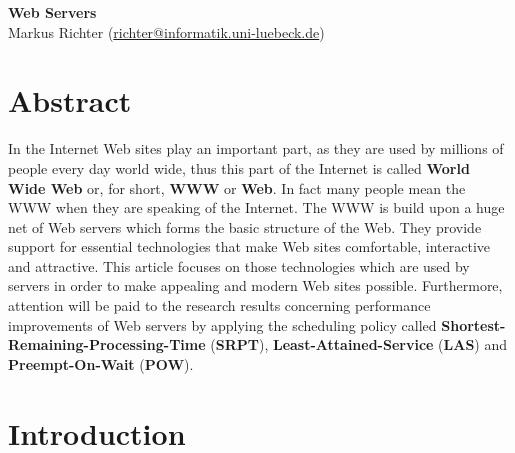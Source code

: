 \documentclass[
  a4paper,               %
  twoside,               %
  headings=small,        %
  DIV=12,                %
  BCOR=1cm,              %
  headinclude=true,      %
  footinclude=true,      %
  numbers=noenddot,      %
  11pt]{scrartcl}        %
\begin{document}
\begin{center}
\textbf{\huge Web Servers} \\[1em]
Markus Richter (\url{richter@informatik.uni-luebeck.de})
\end{center}


\section*{Abstract}

In the Internet Web sites play an important part, as they are used by millions of people every day world wide, thus this part of the Internet is called \textbf{World Wide Web} or, for short, \textbf{WWW} or \textbf{Web}. In fact many people mean the WWW when they are speaking of the Internet. The WWW is build upon a huge net of Web servers which forms the basic structure of the Web. They provide support for essential technologies that make Web sites comfortable, interactive and attractive. This article focuses on those technologies which are used by servers in order to make appealing and modern Web sites possible. Furthermore, attention will be paid to the research results concerning performance improvements of Web servers by applying the scheduling policy called \textbf{Shortest-Remaining-Processing-Time} (\textbf{SRPT}), \textbf{Least-Attained-Service}
(\textbf{LAS}) and \textbf{Preempt-On-Wait} (\textbf{POW}).


\section{Introduction}
\end{document}

